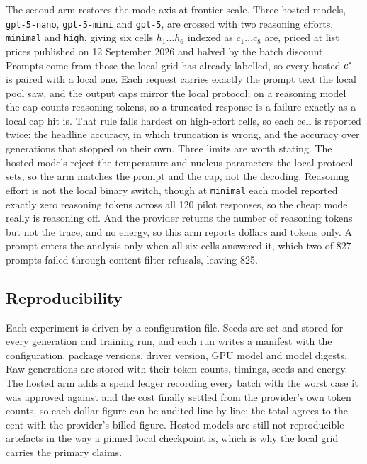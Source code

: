 The second arm restores the mode axis at frontier scale. Three hosted models,
\texttt{gpt-5-nano}, \texttt{gpt-5-mini} and \texttt{gpt-5}, are crossed with
two reasoning efforts, \texttt{minimal} and \texttt{high}, giving six cells
$h_1 \dots h_6$ indexed as $c_1 \dots c_8$ are, priced at list prices
published on 12 September 2026 and halved by the batch discount. Prompts come
from those the local grid has already labelled, so every hosted $c^{*}$ is
paired with a local one. Each request carries exactly the prompt text the
local pool saw, and the output caps mirror the local protocol; on a reasoning
model the cap counts reasoning tokens, so a truncated response is a failure
exactly as a local cap hit is. That rule falls hardest on high-effort cells,
so each cell is reported twice: the headline accuracy, in which truncation is
wrong, and the accuracy over generations that stopped on their own. Three
limits are worth stating. The hosted models reject the temperature and
nucleus parameters the local protocol sets, so the arm matches the prompt and
the cap, not the decoding. Reasoning effort is not the local binary switch,
though at \texttt{minimal} each model reported exactly zero reasoning tokens
across all 120 pilot responses, so the cheap mode really is reasoning off.
And the provider returns the number of reasoning tokens but not the trace,
and no energy, so this arm reports dollars and tokens only. A prompt enters
the analysis only when all six cells answered it, which two of 827 prompts
failed through content-filter refusals, leaving 825.

\subsection{Reproducibility}
\label{sec:setup-repro}

Each experiment is driven by a configuration file. Seeds are set and stored
for every generation and training run, and each run writes a manifest with
the configuration, package versions, driver version, GPU model and model
digests.
Raw generations are stored with their token counts, timings, seeds and
energy. The hosted arm adds a spend ledger recording every batch with the
worst case it was approved against and the cost finally settled from the
provider's own token counts, so each dollar figure can be audited line by
line; the total agrees to the cent with the provider's billed figure. Hosted
models are still not reproducible artefacts in the way a pinned local
checkpoint is, which is why the local grid carries the primary claims.

